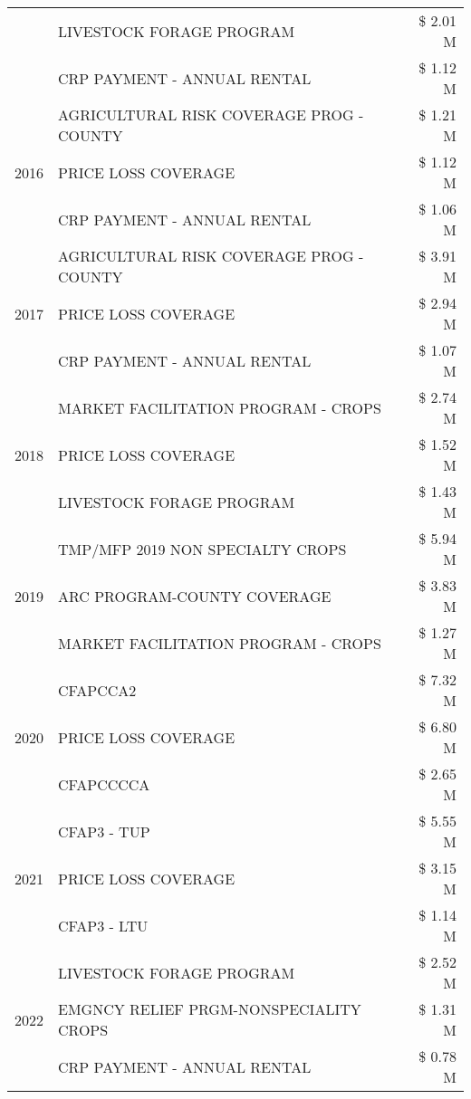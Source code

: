 \begin{tabular}{llr}
 & LIVESTOCK FORAGE PROGRAM & \$ 2.01 M \\
 & CRP PAYMENT - ANNUAL RENTAL & \$ 1.12 M \\
\cline{1-3}
\multirow[t]{3}{*}{2016} & AGRICULTURAL RISK COVERAGE PROG - COUNTY & \$ 1.21 M \\
 & PRICE LOSS COVERAGE & \$ 1.12 M \\
 & CRP PAYMENT - ANNUAL RENTAL & \$ 1.06 M \\
\cline{1-3}
\multirow[t]{3}{*}{2017} & AGRICULTURAL RISK COVERAGE PROG - COUNTY & \$ 3.91 M \\
 & PRICE LOSS COVERAGE & \$ 2.94 M \\
 & CRP PAYMENT - ANNUAL RENTAL & \$ 1.07 M \\
\cline{1-3}
\multirow[t]{3}{*}{2018} & MARKET FACILITATION PROGRAM - CROPS & \$ 2.74 M \\
 & PRICE LOSS COVERAGE & \$ 1.52 M \\
 & LIVESTOCK FORAGE PROGRAM & \$ 1.43 M \\
\cline{1-3}
\multirow[t]{3}{*}{2019} & TMP/MFP 2019 NON SPECIALTY CROPS & \$ 5.94 M \\
 & ARC PROGRAM-COUNTY COVERAGE & \$ 3.83 M \\
 & MARKET FACILITATION PROGRAM - CROPS & \$ 1.27 M \\
\cline{1-3}
\multirow[t]{3}{*}{2020} & CFAPCCA2 & \$ 7.32 M \\
 & PRICE LOSS COVERAGE & \$ 6.80 M \\
 & CFAPCCCCA & \$ 2.65 M \\
\cline{1-3}
\multirow[t]{3}{*}{2021} & CFAP3 - TUP & \$ 5.55 M \\
 & PRICE LOSS COVERAGE & \$ 3.15 M \\
 & CFAP3 - LTU & \$ 1.14 M \\
\cline{1-3}
\multirow[t]{3}{*}{2022} & LIVESTOCK FORAGE PROGRAM & \$ 2.52 M \\
 & EMGNCY RELIEF PRGM-NONSPECIALITY CROPS & \$ 1.31 M \\
 & CRP PAYMENT - ANNUAL RENTAL & \$ 0.78 M \\
\cline{1-3}
\bottomrule
\end{tabular}
